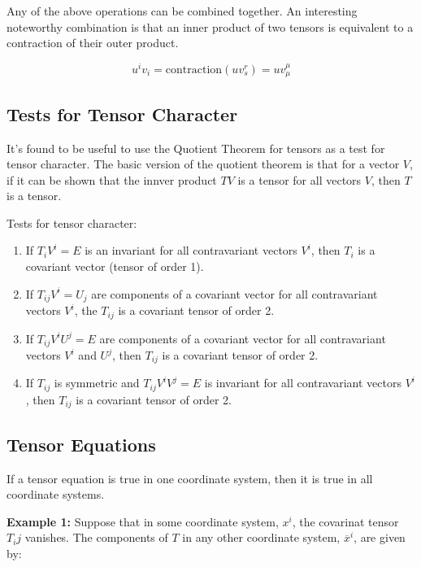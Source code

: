 \documentclass{article}
\begin{document}
Any of the above operations can be combined together.  An interesting noteworthy combination is that an inner product of two tensors is equivalent to a contraction of their outer product.

\begin{equation*}
	u^i v_i = \text{contraction}( uv^r_s ) = uv^{\mu}_{\mu}
\end{equation*}


\subsection{Tests for Tensor Character}

It's found to be useful to use the Quotient Theorem for tensors as a test for tensor character.  The basic version of the quotient theorem is that for a vector $V$,
if it can be shown that the innver product $TV$ is a tensor for all vectors $V$, then $T$ is a tensor.

Tests for tensor character:

\begin{enumerate}
	\item If $T_i V^i = E$ is an invariant for all contravariant vectors $V^i$, then $T_i$ is a covariant vector (tensor of order 1).
	\item If $T_{ij} V^i = U_j$ are components of a covariant vector for all contravariant vectors $V^i$, the $T_{ij}$ is a covariant tensor of order 2.
	\item If $T_{ij} V^i U^j = E$ are components of a covariant vector for all contravariant vectors $V^i$ and $U^j$, then $T_{ij}$ is a covariant tensor of order 2.
	\item If $T_{ij}$ is symmetric and $T_{ij} V^i V^j = E$ is invariant for all contravariant vectors $V^i$, then $T_{ij}$ is a covariant tensor of order 2.
\end{enumerate}



\subsection{Tensor Equations}

If a tensor equation is true in one coordinate system, then it is true in all coordinate systems.

\noindent \textbf{Example 1: }
Suppose that in some coordinate system, $x^i$, the covarinat tensor $T_ij$ vanishes.  The components of $T$ in any other coordinate system, $\overline{ x }^i$, are given by:
\end{document}
